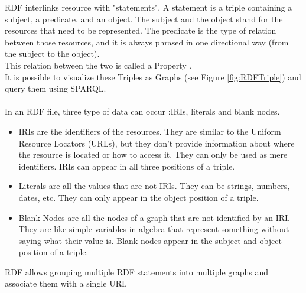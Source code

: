 RDF interlinks resource with "statements". A statement is a triple containing a subject, a predicate, and an object.
The subject and the object stand for the resources that need to be represented. The predicate is the type of relation between those resources, and it is always phrased in one directional way (from the subject to the object). 
\\
This relation between the two is called a Property \cite{rdf}.
\\
It is possible to visualize these Triples as Graphs (see Figure \ref{fig:RDFTriple}) and query them using SPARQL.
\\
\\
In an RDF file, three type of data can  occur :IRIs, literals and blank nodes. 
\begin{itemize}
	\item IRIs are the identifiers of the resources. They are similar to the Uniform Resource Locators (URLs), but they don't provide information about where the resource is located or how to access it. They can only be used as mere identifiers. IRIs can appear in all three positions of a triple. 
	\item Literals are all the values that are not IRIs. They can be strings, numbers, dates, etc. They can only appear in the object position of a triple.
	\item Blank Nodes are all the nodes of a graph that are not identified by an IRI. They are like simple variables in algebra that represent something without saying what their value is. Blank nodes appear in the subject and object position of a triple. 
\end{itemize}
RDF allows grouping multiple RDF statements into multiple graphs and associate them with a single URI. 

